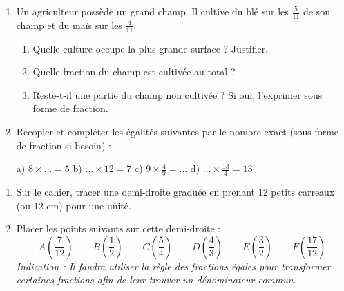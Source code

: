\documentclass[a4paper]{book}
\begin{document}
\setcounter{chapter}{11}
\renewcommand{\monTitre}{Les fractions : Bilan}

\enteteActivite{6}{\monTitre}{\thechapter}

    \begin{exercice}
        \begin{enumerate}
            \item Un agriculteur possède un grand champ. Il cultive du blé sur les $\frac{5}{11}$ de son champ et du maïs sur les $\frac{4}{11}$.
            \begin{enumerate}
                \item Quelle culture occupe la plus grande surface ? Justifier.
                \item Quelle fraction du champ est cultivée au total ?
                \item Reste-t-il une partie du champ non cultivée ? Si oui, l'exprimer sous forme de fraction.
            \end{enumerate}
            \item Recopier et compléter les égalités suivantes par le nombre exact (sous forme de fraction si besoin) :
            
            \vspace{0.2cm}
            a) $8 \times \dots = 5$ \hfill b) $\dots \times 12 = 7$ \hfill c) $9 \times \frac{4}{9} = \dots$ \hfill d) $\dots \times \frac{13}{4} = 13$ \hfill
        \end{enumerate}
    \end{exercice}
    
    
    \begin{exercice}
        \begin{enumerate}
            \item Sur le cahier, tracer une demi-droite graduée en prenant 12 petits carreaux (ou 12 cm) pour une unité.
            \item Placer les points suivants sur cette demi-droite :
            \[ A\left(\frac{7}{12}\right) \qquad B\left(\frac{1}{2}\right) \qquad C\left(\frac{5}{4}\right) \qquad D\left(\frac{4}{3}\right) \qquad E\left(\frac{3}{2}\right) \qquad F\left(\frac{17}{12}\right) \]
            \textit{Indication : Il faudra utiliser la règle des fractions égales pour transformer certaines fractions afin de leur trouver un dénominateur commun.}
        \end{enumerate}
    \end{exercice}
    
\end{document}
